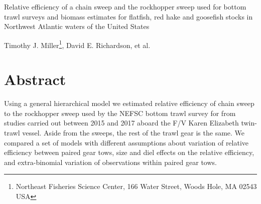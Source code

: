 \documentclass[12pt,letterpaper, leqno]{article}
\begin{document}


\pagestyle{plain}

\begin{titlepage}\center \large

\vspace{144pt}

Relative efficiency of a chain sweep and the rockhopper sweep used for bottom trawl surveys and biomass estimates for flatfish, red hake and goosefish stocks in Northwest Atlantic waters of the United States

\vspace{144pt}

Timothy J. Miller\footnote{Northeast Fisheries Science Center, 166 Water Street, Woods Hole, MA 02543 USA}, 
David E. Richardson, et al.\\

\end{titlepage}

\setcounter{page}{2}

\cfoot{\thepage}

\setcounter{page}{2}
\def\fourteenbold{\fontseries{b}\fontsize{14pt}{12pt}\selectfont}
\def\twelvebold{\fontseries{b}\fontsize{12pt}{12pt}\selectfont}
\def\twelveit{\fontshape{it}\fontseries{m}\fontsize{12pt}{12pt}\selectfont}
\sectionfont{\fourteenbold}
\subsectionfont{\twelvebold}
\subsectionfont{\twelvebold}
\subsubsectionfont{\twelveit}

\section*{Abstract}

Using a general hierarchical model we estimated relative efficiency of chain sweep to the rockhopper sweep used by the NEFSC bottom trawl survey for  from studies carried out between 2015 and 2017 aboard the F/V Karen Elizabeth twin-trawl vessel. Aside from the sweeps, the rest of the trawl gear is the same.  We compared a set of models with different assumptions about variation of relative efficiency between paired gear tows, size and diel effects on the relative efficiency, and extra-binomial variation of observations within paired gear tows.  %
\end{document}
